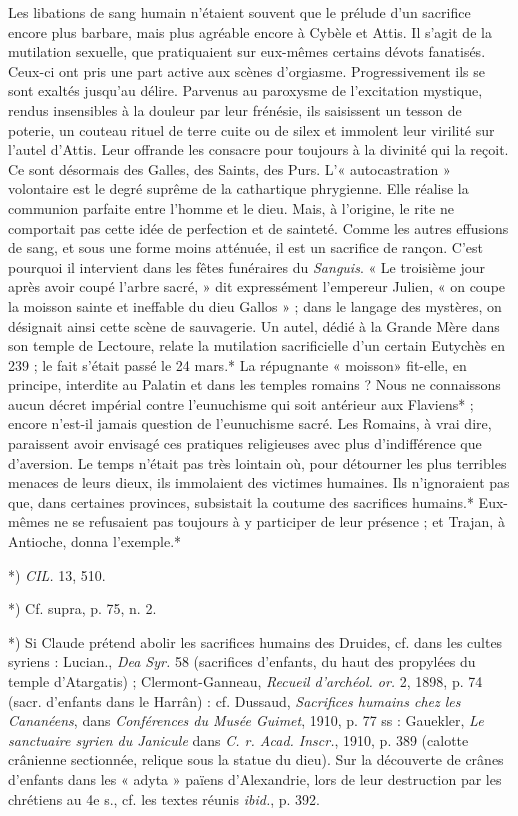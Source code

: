 \documentclass[a4paper, 11pt, oneside, polutonikogreek, french]{article}
\begin{document}
Les libations de sang humain n'étaient souvent que le prélude d'un sacrifice encore plus barbare, mais plus agréable encore à Cybèle et Attis. Il s'agit de la mutilation sexuelle, que pratiquaient sur eux-mêmes certains dévots fanatisés. Ceux-ci ont pris une part active aux scènes d'orgiasme. Progressivement ils se sont exaltés jusqu'au délire. Parvenus au paroxysme de l'excitation mystique, rendus insensibles à la douleur par leur frénésie, ils saisissent un tesson de poterie, un couteau rituel de terre cuite ou de silex et immolent leur virilité sur l'autel d'Attis. Leur offrande les consacre pour toujours à la divinité qui la reçoit. Ce sont désormais des Galles, des Saints, des Purs. L'« autocastration » volontaire est le degré suprême de la cathartique phrygienne. Elle réalise la communion parfaite entre l'homme et le dieu. Mais, à l'origine, le rite ne comportait pas cette idée de perfection et de sainteté. Comme les autres effusions de sang, et sous une forme moins atténuée, il est un sacrifice de rançon. C'est pourquoi il intervient dans les fêtes funéraires du \emph{Sanguis}. « Le troisième jour après avoir coupé l'arbre sacré, » dit expressément l'empereur Julien, « on coupe la moisson sainte et ineffable du dieu Gallos » ; dans le langage des mystères, on désignait ainsi cette scène de sauvagerie. Un autel, dédié à la Grande Mère dans son temple de Lectoure, relate la mutilation sacrificielle d'un certain Eutychès en 239 ; le fait s'était passé le 24 mars.* La répugnante « moisson» fit-elle, en principe, interdite au Palatin et dans les temples romains ? Nous ne connaissons aucun décret impérial contre l'eunuchisme qui soit antérieur aux Flaviens* ; encore n'est-il jamais question de l'eunuchisme sacré. Les Romains, à vrai dire, paraissent avoir envisagé ces pratiques religieuses avec plus d'indifférence que d'aversion. Le temps n'était pas très lointain où, pour détourner les plus terribles menaces de leurs dieux, ils immolaient des victimes humaines. Ils n'ignoraient pas que, dans certaines provinces, subsistait la coutume des sacrifices humains.* Eux-mêmes ne se refusaient pas toujours à y participer de leur présence ; et Trajan, à Antioche, donna l'exemple.*

*) \emph{CIL.} 13, 510.

*) Cf. supra, p. 75, n. 2.

*) Si Claude prétend abolir les sacrifices humains des Druides, cf. dans les cultes syriens : Lucian., \emph{Dea Syr.} 58 (sacrifices d'enfants, du haut des propylées du temple d'Atargatis) ; Clermont-Ganneau, \emph{Recueil d'archéol. or.} 2, 1898, p. 74 (sacr. d'enfants dans le Harrân) : cf. Dussaud, \emph{Sacrifices humains chez les Cananéens}, dans \emph{Conférences du Musée Guimet}, 1910, p. 77 ss : Gauekler, \emph{Le sanctuaire syrien du Janicule} dans \emph{C. r. Acad. Inscr.}, 1910, p. 389 (calotte crânienne sectionnée, relique sous la statue du dieu). Sur la découverte de crânes d'enfants dans les « adyta » païens d'Alexandrie, lors de leur destruction par les chrétiens au 4e s., cf. les textes réunis \emph{ibid.}, p. 392.
\end{document}
